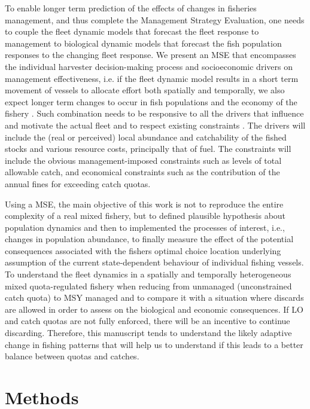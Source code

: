 \documentclass[12pt,oneline,a4paper,numbib]{ouparticle}
\numberwithin{equation}{subsection} %
\begin{document}
To enable longer term prediction of the effects of changes in fisheries management, and thus complete the Management Strategy Evaluation, one needs to couple the fleet dynamic models that forecast the fleet response to management to  biological dynamic models that forecast the fish population responses to the changing fleet response. We present an MSE that encompasses the individual harvester decision-making process and socioeconomic drivers on management effectiveness, i.e. if the fleet dynamic model results in a short term movement of vessels to allocate effort both spatially and temporally, we also expect longer term changes to occur in fish populations and the economy of the fishery \cite{Alzorriz2018}. Such combination needs to be responsive to all the drivers that influence and motivate the actual fleet and to respect existing constraints \cite{Venables2009}. The drivers will include the (real or perceived) local abundance and catchability of the fished stocks and various resource costs, principally that of fuel. The constraints will include the obvious management-imposed constraints such as levels of total allowable catch, and economical constraints such as the contribution of the annual fines for exceeding catch quotas.

Using a MSE, the main objective of this work is not to reproduce the entire complexity of a real mixed fishery, but to defined plausible hypothesis about population dynamics and then to implemented the processes of interest, i.e., changes in population abundance, to finally measure the effect of the potential consequences associated with the fishers optimal choice location underlying assumption of the current state-dependent behaviour of individual fishing vessels. To understand the fleet dynamics in a spatially and temporally heterogeneous mixed quota-regulated fishery when reducing from unmanaged (unconstrained catch quota) to MSY managed and to compare it with a situation where discards are allowed in order to assess on the biological and economic consequences. If LO and catch quotas are not fully enforced, there will be an incentive to continue discarding. Therefore, this manuscript tends to understand the likely adaptive change in fishing patterns that will help us to understand if this leads to a better balance between quotas and catches.



\section{Methods}
\end{document}
